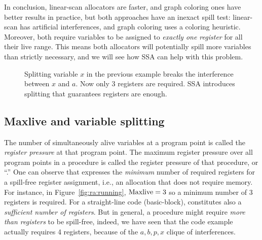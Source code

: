 {\medskip

In conclusion, linear-scan allocators are faster, and graph coloring ones have better results in practice, but both approaches have an inexact spill test: linear-scan has artificial interferences, and graph coloring uses a coloring heuristic.
Moreover, both require variables to be assigned to \emph{exactly one register} for all their live range.
This means both allocators will potentially spill more variables than strictly necessary, and we will see how SSA can help with this problem.


\begin{figure}
  \begin{center}
  \end{center}
  \caption{Splitting variable $x$ in the previous example breaks the 
    interference between $x$ and $a$. Now only 3 registers are required.
    SSA introduces splitting that guarantees \maxlive registers are enough.
  }
  \label{fig:ra:running-split-SSA}
\end{figure}



\subsection{Maxlive and variable splitting}




The number of simultaneously alive variables at a program point is called the \emph{register pressure} at that program point.
%
The maximum register pressure over all program points in a procedure is called the register pressure of that procedure, or ``\maxlive.'' 
One can observe that \maxlive expresses the \emph{minimum} number of required registers for a spill-free register assignment, i.e., an allocation that does not require memory.
For instance, in Figure~\ref{fig:ra:running}, $\mathrm{Maxlive} = 3$ so a minimum number of 3 registers is required.
For a straight-line code (basic-block), \maxlive constitutes also a \emph{sufficient number of registers}.
But in general, a procedure might require \emph{more than \maxlive registers} to be spill-free, indeed, we have seen that the code example actually requires 4 registers, because of the $a,b,p,x$ clique of interferences.




}
